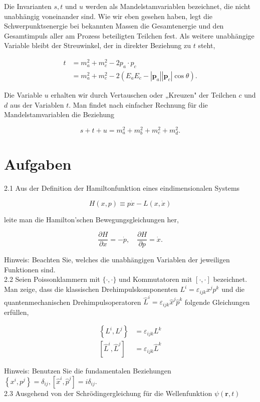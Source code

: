 \documentclass[10pt, letterpaper]{article}
\begin{document}
Die Invarianten $s, t$ und $u$ werden als Mandelstamvariablen bezeichnet, die nicht unabhängig voneinander sind. Wie wir eben gesehen haben, legt die Schwerpunktsenergie bei bekannten Massen die Gesamtenergie und den Gesamtimpuls aller am Prozess beteiligten Teilchen fest. Als weitere unabhängige Variable bleibt der Streuwinkel, der in direkter Beziehung zu $t$ steht,

$$
\begin{aligned}
t & =m_{a}^{2}+m_{c}^{2}-2 p_{a} \cdot p_{c} \\
& =m_{a}^{2}+m_{c}^{2}-2\left(E_{a} E_{c}-\left|\mathbf{p}_{a}\right|\left|\mathbf{p}_{c}\right| \cos \theta\right) .
\end{aligned}
$$

Die Variable $u$ erhalten wir durch Vertauschen oder „Kreuzen" der Teilchen $c$ und $d$ aus der Variablen $t$. Man findet nach einfacher Rechnung für die Mandelstamvariablen die Beziehung

$$
s+t+u=m_{a}^{2}+m_{b}^{2}+m_{c}^{2}+m_{d}^{2} .
$$

\section*{Aufgaben}
2.1 Aus der Definition der Hamiltonfunktion eines eindimensionalen Systems

$$
H(x, p) \equiv p \dot{x}-L(x, \dot{x})
$$

leite man die Hamilton'schen Bewegungsgleichungen her,

$$
\frac{\partial H}{\partial x}=-\dot{p}, \quad \frac{\partial H}{\partial p}=\dot{x} .
$$

Hinweis: Beachten Sie, welches die unabhängigen Variablen der jeweiligen Funktionen sind.\\
2.2 Seien Poissonklammern mit $\{\cdot, \cdot\}$ und Kommutatoren mit $[\cdot, \cdot]$ bezeichnet. Man zeige, dass die klassischen Drehimpulskomponenten $L^{i}=\varepsilon_{i j k} x^{j} p^{k}$ und die quantenmechanischen Drehimpulsoperatoren $\hat{L}^{i}=\varepsilon_{i j k} \hat{x}^{j} \hat{p}^{k}$ folgende Gleichungen erfüllen,

$$
\begin{aligned}
\left\{L^{i}, L^{j}\right\} & =\varepsilon_{i j k} L^{k} \\
{\left[\hat{L}^{i}, \hat{L}^{j}\right] } & =\varepsilon_{i j k} \hat{L}^{k}
\end{aligned}
$$

Hinweis: Benutzen Sie die fundamentalen Beziehungen\\
$\left\{x^{i}, p^{j}\right\}=\delta_{i j},\left[\hat{x}^{i}, \hat{p}^{j}\right]=i \delta_{i j}$.\\
2.3 Ausgehend von der Schrödingergleichung für die Wellenfunktion $\psi(\mathbf{r}, t)$
\end{document}

